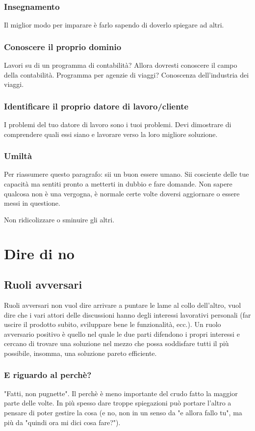 \documentclass[11pt,a4paper]{book}
\begin{document}
\subsection{Insegnamento}
Il miglior modo per imparare è farlo sapendo di doverlo spiegare ad altri.

\subsection{Conoscere il proprio dominio}
Lavori su di un programma di contabilità? Allora dovresti conoscere il campo della contabilità. Programma per agenzie di viaggi? Conoscenza dell'industria dei viaggi.

\subsection{Identificare il proprio datore di lavoro/cliente}
I problemi del tuo datore di lavoro sono i tuoi problemi. Devi dimostrare di comprendere quali essi siano e lavorare verso la loro migliore soluzione.

\subsection{Umiltà}
Per riassumere questo paragrafo: sii un buon essere umano. Sii cosciente delle tue capacità ma sentiti pronto a metterti in dubbio e fare domande. Non sapere qualcosa non è una vergogna, è normale certe volte doversi aggiornare o essere messi in questione.

Non ridicolizzare o sminuire gli altri.

\chapter{Dire di no}
\section{Ruoli avversari}
Ruoli avversari non vuol dire arrivare a puntare le lame al collo dell'altro, vuol dire che i vari attori delle discussioni hanno degli interessi lavorativi personali (far uscire il prodotto subito, sviluppare bene le funzionalità, ecc.). Un ruolo avversario positivo è quello nel quale le due parti difendono i propri interessi e cercano di trovare una soluzione nel mezzo che possa soddisfare tutti il più possibile, insomma, una soluzione pareto efficiente.

\subsection{E riguardo al perchè?}
"Fatti, non pugnette". Il perchè è meno importante del crudo fatto la maggior parte delle volte. In più spesso dare troppe spiegazioni può portare l'altro a pensare di poter gestire la cosa (e no, non in un senso da "e allora fallo tu", ma più da "quindi ora mi dici cosa fare?").
\end{document}
